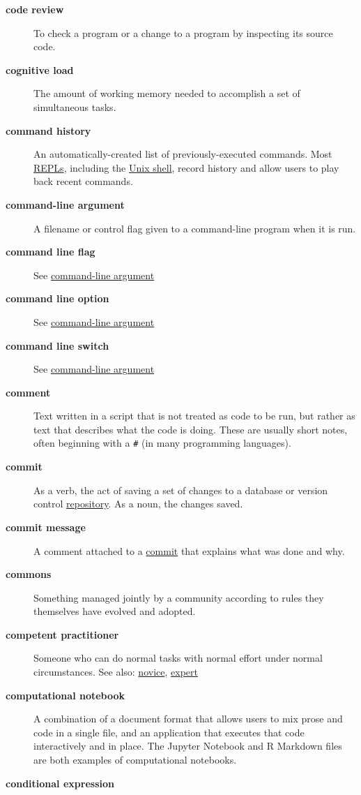 \documentclass[
]{krantz}
\begin{document}
\begin{description}
\item[\textbf{code review}]
To check a program or a change to a program by inspecting its source code.
\item[\textbf{cognitive load}]
The amount of working memory needed to accomplish a set of simultaneous tasks.
\item[\textbf{command history}]
An automatically-created list of previously-executed commands. Most \protect\hyperlink{repl}{REPLs}, including the \protect\hyperlink{shell}{Unix shell}, record history and allow users to play back recent commands.
\item[\textbf{command-line argument}]
A filename or control flag given to a command-line program when it is run.
\item[\textbf{command line flag}]
See \protect\hyperlink{command_line_argument}{command-line argument}
\item[\textbf{command line option}]
See \protect\hyperlink{command_line_argument}{command-line argument}
\item[\textbf{command line switch}]
See \protect\hyperlink{command_line_argument}{command-line argument}
\item[\textbf{comment}]
Text written in a script that is not treated as code to be run, but rather as text that describes what the code is doing. These are usually short notes, often beginning with a \texttt{\#} (in many programming languages).
\item[\textbf{commit}]
As a verb, the act of saving a set of changes to a database or version control \protect\hyperlink{repository}{repository}. As a noun, the changes saved.
\item[\textbf{commit message}]
A comment attached to a \protect\hyperlink{commit}{commit} that explains what was done and why.
\item[\textbf{commons}]
Something managed jointly by a community according to rules they themselves have evolved and adopted.
\item[\textbf{competent practitioner}]
Someone who can do normal tasks with normal effort under normal circumstances. See also: \protect\hyperlink{novice}{novice}, \protect\hyperlink{expert}{expert}
\item[\textbf{computational notebook}]
A combination of a document format that allows users to mix prose and code in a single file, and an application that executes that code interactively and in place. The Jupyter Notebook and R Markdown files are both examples of computational notebooks.
\item[\textbf{conditional expression}]

\end{description}
\end{document}
